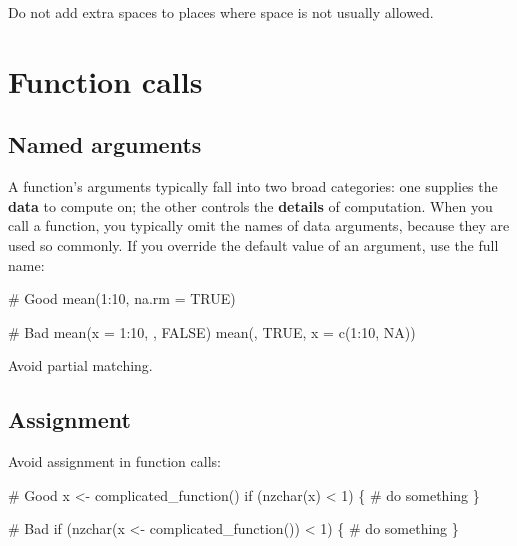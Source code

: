 \documentclass[twoside, pagesize, fontsize=11pt, dvipsnames]{scrreport} %
\newenvironment{Shaded}{\begin{snugshade}}{\end{snugshade}}
\newcommand{\AttributeTok}[1]{\textcolor[rgb]{0.40,0.45,0.13}{#1}}
\newcommand{\CommentTok}[1]{\textcolor[rgb]{0.37,0.37,0.37}{#1}}
\newcommand{\ConstantTok}[1]{\textcolor[rgb]{0.56,0.35,0.01}{#1}}
\newcommand{\ControlFlowTok}[1]{\textcolor[rgb]{0.00,0.23,0.31}{#1}}
\newcommand{\DecValTok}[1]{\textcolor[rgb]{0.68,0.00,0.00}{#1}}
\newcommand{\FunctionTok}[1]{\textcolor[rgb]{0.28,0.35,0.67}{#1}}
\newcommand{\NormalTok}[1]{\textcolor[rgb]{0.00,0.23,0.31}{#1}}
\newcommand{\OtherTok}[1]{\textcolor[rgb]{0.00,0.23,0.31}{#1}}
\newcommand{\SpecialCharTok}[1]{\textcolor[rgb]{0.37,0.37,0.37}{#1}}
\begin{document}
Do not add extra spaces to places where space is not usually allowed.

\hypertarget{function-calls}{%
\section{Function calls}\label{function-calls}}

\hypertarget{argument-names}{%
\subsection{Named arguments}\label{argument-names}}

A function's arguments typically fall into two broad categories: one
supplies the \textbf{data} to compute on; the other controls the
\textbf{details} of computation. When you call a function, you typically
omit the names of data arguments, because they are used so commonly. If
you override the default value of an argument, use the full name:

\begin{Shaded}
\begin{Highlighting}[]
\CommentTok{\# Good}
\FunctionTok{mean}\NormalTok{(}\DecValTok{1}\SpecialCharTok{:}\DecValTok{10}\NormalTok{, }\AttributeTok{na.rm =} \ConstantTok{TRUE}\NormalTok{)}

\CommentTok{\# Bad}
\FunctionTok{mean}\NormalTok{(}\AttributeTok{x =} \DecValTok{1}\SpecialCharTok{:}\DecValTok{10}\NormalTok{, , }\ConstantTok{FALSE}\NormalTok{)}
\FunctionTok{mean}\NormalTok{(, }\ConstantTok{TRUE}\NormalTok{, }\AttributeTok{x =} \FunctionTok{c}\NormalTok{(}\DecValTok{1}\SpecialCharTok{:}\DecValTok{10}\NormalTok{, }\ConstantTok{NA}\NormalTok{))}
\end{Highlighting}
\end{Shaded}

Avoid partial matching.

\hypertarget{assignment}{%
\subsection{Assignment}\label{assignment}}

Avoid assignment in function calls:

\begin{Shaded}
\begin{Highlighting}[]
\CommentTok{\# Good}
\NormalTok{x }\OtherTok{\textless{}{-}} \FunctionTok{complicated\_function}\NormalTok{()}
\ControlFlowTok{if}\NormalTok{ (}\FunctionTok{nzchar}\NormalTok{(x) }\SpecialCharTok{\textless{}} \DecValTok{1}\NormalTok{) \{}
  \CommentTok{\# do something}
\NormalTok{\}}

\CommentTok{\# Bad}
\ControlFlowTok{if}\NormalTok{ (}\FunctionTok{nzchar}\NormalTok{(x }\OtherTok{\textless{}{-}} \FunctionTok{complicated\_function}\NormalTok{()) }\SpecialCharTok{\textless{}} \DecValTok{1}\NormalTok{) \{}
  \CommentTok{\# do something}
\NormalTok{\}}
\end{Highlighting}
\end{Shaded}
\end{document}
